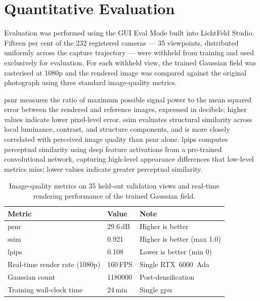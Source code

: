 \section{Quantitative Evaluation}
\label{sec:recon-eval}

Evaluation was performed using the GUI Eval Mode built into LichtFeld Studio. Fifteen per cent of the 232 registered cameras — 35 viewpoints, distributed uniformly across the capture trajectory — were withheld from training and used exclusively for evaluation. For each withheld view, the trained Gaussian field was rasterised at 1080p and the rendered image was compared against the original photograph using three standard image-quality metrics.

\acrshort{psnr} measures the ratio of maximum possible signal power to the mean squared error between the rendered and reference images, expressed in decibels; higher values indicate lower pixel-level error. \acrshort{ssim} \parencite{Wang2004SSIM} evaluates structural similarity across local luminance, contrast, and structure components, and is more closely correlated with perceived image quality than \acrshort{psnr} alone. \acrshort{lpips} \parencite{Zhang2018LPIPS} computes perceptual similarity using deep feature activations from a pre-trained convolutional network, capturing high-level appearance differences that low-level metrics miss; lower values indicate greater perceptual similarity.

\begin{table}[htbp]
  \centering
  \caption{Image-quality metrics on 35 held-out validation views and real-time rendering performance of the trained Gaussian field.}
  \label{tab:recon-metrics}
  \begin{tabular}{@{}L{5.5cm} C{2.5cm} L{4.5cm}@{}}
    \toprule
    \textbf{Metric} & \textbf{Value} & \textbf{Note} \\
    \midrule
    \acrshort{psnr}                              & 29.6\,dB     & Higher is better \\
    \acrshort{ssim} \parencite{Wang2004SSIM}     & 0.921        & Higher is better (max 1.0) \\
    \acrshort{lpips} \parencite{Zhang2018LPIPS}  & 0.108        & Lower is better (min 0) \\
    \midrule
    Real-time render rate (1080p)                & 160\,FPS     & Single RTX~6000~Ada \\
    Gaussian count                               & \num{1180000} & Post-densification \\
    Training wall-clock time                     & 24\,min      & Single \acrshort{gpu} \\
    \bottomrule
  \end{tabular}
\end{table}

